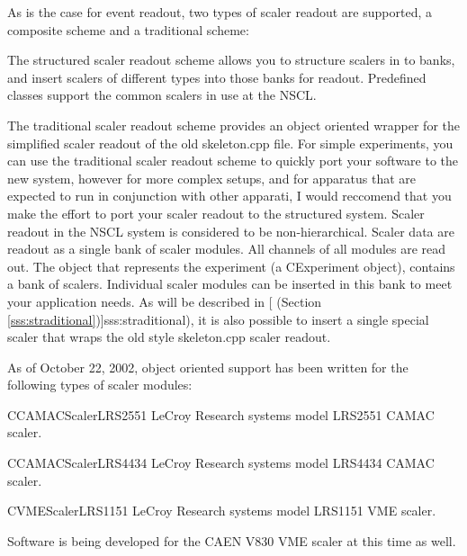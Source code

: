       As is the case for event readout, two types of scaler readout are
      supported, a composite scheme and a traditional scheme:
      
      The structured scaler readout scheme allows you to structure
      scalers in to banks, and insert scalers of different types into
      those banks for readout.  Predefined classes support the common
      scalers in use at the NSCL.  
      
      The traditional scaler readout scheme provides an object oriented 
      wrapper for the simplified scaler readout of the old skeleton.cpp
      file.  For simple experiments, you can use the traditional 
      scaler readout scheme to quickly port your software to the new
      system, however for more complex setups, and for apparatus that are
      expected to run in conjunction with other apparati, I would reccomend 
      that you make the effort to port your scaler readout to the structured
      system.
	 Scaler readout in the  NSCL system is considered to be
	 non-hierarchical.  Scaler data are readout as a single
	 bank of scaler modules.  All channels of all modules
	 are read out.  The object that represents the
	 experiment (a CExperiment object), contains a
	 bank of scalers.  Individual scaler modules can be
	 inserted in this bank to meet your application needs.
	 As will be described in 
	 [ 
	 (Section \ref{sss:straditional})]{sss:straditional}), it is also
	 possible to insert a single special scaler that wraps the
	 old style skeleton.cpp scaler readout.
	 
	 As of October 22, 2002, object oriented support has been 
	 written for the following types of scaler modules:
	 \begin{description}
	    \item{CCAMACScalerLRS2551} LeCroy Research systems model LRS2551 CAMAC scaler.
	    \item{CCAMACScalerLRS4434} LeCroy Research systems model LRS4434 CAMAC scaler.
	    \item{CVMEScalerLRS1151}   LeCroy Research systems model LRS1151 VME scaler.
	 \end{description}
	 Software is being developed for the CAEN V830 VME scaler at this time as well.
	 
